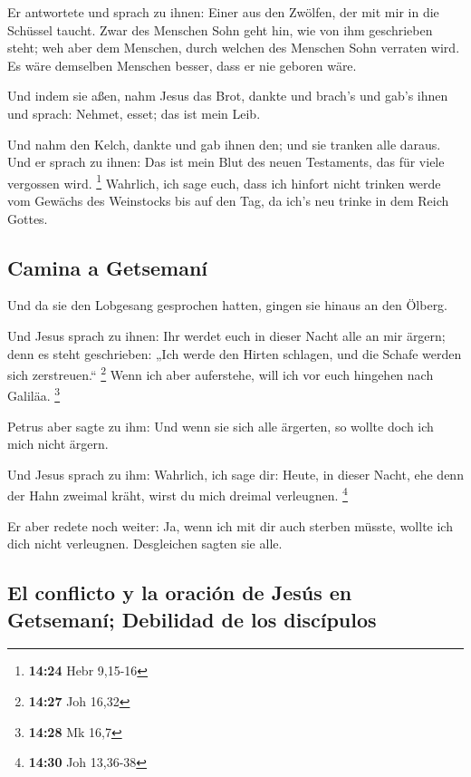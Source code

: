  Er antwortete und sprach zu ihnen: Einer aus den
Zwölfen, der mit mir in die Schüssel taucht.  Zwar des
Menschen Sohn geht hin, wie von ihm geschrieben steht; weh aber dem
Menschen, durch welchen des Menschen Sohn verraten wird. Es wäre
demselben Menschen besser, dass er nie geboren wäre.

 Und indem sie aßen, nahm Jesus das Brot, dankte und
brach's und gab's ihnen und sprach: Nehmet, esset; das ist mein Leib.

 Und nahm den Kelch, dankte und gab ihnen den; und sie
tranken alle daraus.  Und er sprach zu ihnen: Das ist
mein Blut des neuen Testaments, das für viele vergossen wird.
\footnote{\textbf{14:24} Hebr 9,15-16}  Wahrlich, ich
sage euch, dass ich hinfort nicht trinken werde vom Gewächs des
Weinstocks bis auf den Tag, da ich's neu trinke in dem Reich Gottes.

\hypertarget{camina-a-getsemanuxed}{%
\subsection{Camina a Getsemaní}\label{camina-a-getsemanuxed}}

 Und da sie den Lobgesang gesprochen hatten, gingen sie
hinaus an den Ölberg.

 Und Jesus sprach zu ihnen: Ihr werdet euch in dieser
Nacht alle an mir ärgern; denn es steht geschrieben: „Ich werde den
Hirten schlagen, und die Schafe werden sich zerstreuen.`` \footnote{\textbf{14:27}
  Joh 16,32}  Wenn ich aber auferstehe, will ich vor euch
hingehen nach Galiläa. \footnote{\textbf{14:28} Mk 16,7}

 Petrus aber sagte zu ihm: Und wenn sie sich alle
ärgerten, so wollte doch ich mich nicht ärgern.

 Und Jesus sprach zu ihm: Wahrlich, ich sage dir: Heute,
in dieser Nacht, ehe denn der Hahn zweimal kräht, wirst du mich dreimal
verleugnen. \footnote{\textbf{14:30} Joh 13,36-38}

 Er aber redete noch weiter: Ja, wenn ich mit dir auch
sterben müsste, wollte ich dich nicht verleugnen. Desgleichen sagten sie
alle.

\hypertarget{el-conflicto-y-la-oraciuxf3n-de-jesuxfas-en-getsemanuxed-debilidad-de-los-discuxedpulos}{%
\subsection{El conflicto y la oración de Jesús en Getsemaní; Debilidad
de los
discípulos}\label{el-conflicto-y-la-oraciuxf3n-de-jesuxfas-en-getsemanuxed-debilidad-de-los-discuxedpulos}}

